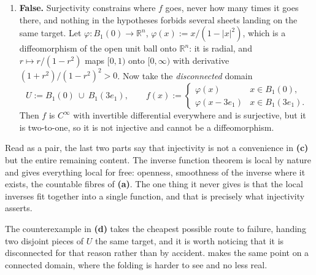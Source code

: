 \begin{exercisesolution}
\begin{enumerate}[label=\textbf{(\alph*)}]
    \cref{thm:inverse_function_theorem} already supplies at each point: near any $y = f(x)$ the
    global inverse agrees with the local one, which is $C^1$.
  \item \textbf{False.} Surjectivity constrains where $f$ goes, never how many times it goes
    there, and nothing in the hypotheses forbids several sheets landing on the same target. Let
    $\varphi : B_1(0) \to \mathbb{R}^n$, $\varphi(x) := x/(1-\lvert x\rvert^2)$, which is a
    diffeomorphism of the open unit ball onto $\mathbb{R}^n$: it is radial, and
    $r \mapsto r/(1-r^2)$ maps $[0,1)$ onto $[0,\infty)$ with derivative
    $(1+r^2)/(1-r^2)^2 > 0$. Now take the \emph{disconnected} domain
    \[U := B_1(0)\ \cup\ B_1(3e_1), \qquad
      f(x) := \begin{cases} \varphi(x) & x \in B_1(0), \\
        \varphi(x - 3e_1) & x \in B_1(3e_1).\end{cases}\]
    Then $f$ is $C^\infty$ with invertible differential everywhere and is surjective, but it is
    two-to-one, so it is not injective and cannot be a diffeomorphism.
\end{enumerate}

\begin{remark}
Read as a pair, the last two parts say that injectivity is not a convenience in \textbf{(c)} but
the entire remaining content. The inverse function theorem is local by nature and gives
everything local for free: openness, smoothness of the inverse where it exists, the countable
fibres of \textbf{(a)}. The one thing it never gives is that the local inverses fit together into
a single function, and that is precisely what injectivity asserts.

The counterexample in \textbf{(d)} takes the cheapest possible route to failure, handing two
disjoint pieces of $U$ the same target, and it is worth noticing that it is disconnected for that
reason rather than by accident.  makes the same
point on a connected domain, where the folding is harder to see and no less real.
\end{remark}
\end{exercisesolution}


